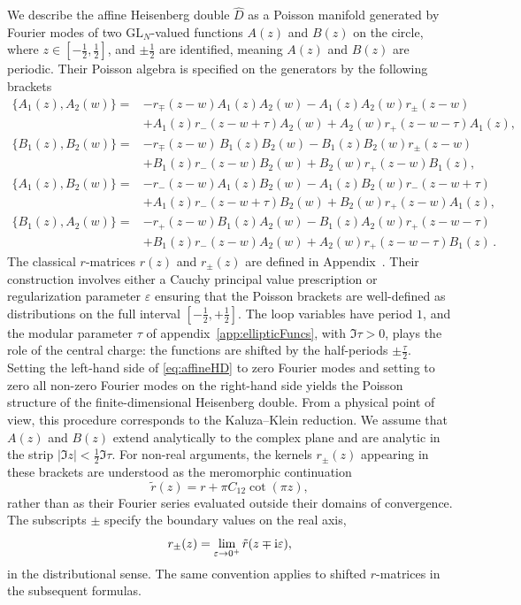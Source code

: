 We describe the affine Heisenberg double $\widehat{D}$ as a Poisson manifold generated by Fourier modes
of two $\mathrm{GL}_N$-valued functions $A(z)$ and $B(z)$ on the circle, where $z\in [-\tfrac12, \tfrac12]$, and $\pm\tfrac{1}{2}$ are identified, meaning $A(z)$ and $B(z)$ are periodic. Their Poisson algebra is specified on the generators by the following brackets
\begin{equation}
\label{eq:affineHD}
\begin{aligned}
\{ A_1(z), A_2(w) \}
= &-r_{\mp}(z-w) A_1(z)A_2(w)
- A_1(z)A_2(w) r_{\pm}(z-w)\\
&+ A_1(z)r_-(z-w+\tau)A_2(w)
+ A_2(w)r_+(z-w-\tau)A_1(z),  \\
\{ B_1(z), B_2(w) \}
=& -r_{\mp}(z-w)\,B_1(z)B_2(w)
- B_1(z)B_2(w) r_{\pm}(z-w) \\
&+ B_1(z)r_-(z-w)B_2(w)
+ B_2(w)r_+(z-w)B_1(z),  \\
\{ A_1(z), B_2(w) \}
=& -r_-(z-w)A_1(z)B_2(w)
- A_1(z)B_2(w)r_-(z-w+\tau) \\
&+ A_1(z)r_-(z-w+\tau)B_2(w)
+ B_2(w)r_+(z-w)A_1(z),   \\
\{ B_1(z), A_2(w) \}
= &-r_+(z-w)B_1(z)A_2(w)
-B_1(z)A_2(w)r_+(z-w-\tau) \\
&+ B_1(z)r_-(z-w)A_2(w)+ A_2(w)r_+(z-w-\tau)B_1(z)
 \, .
\end{aligned}
\end{equation}
The classical $r$-matrices $r(z)$ and $r_{\pm}(z)$ are  defined in Appendix~\todo{[TODO: missing appendix \texttt{app:matrix\_bblocks} of the paper; include the overall factor $\varkappa=2\pi\I$]}.  Their construction involves either a Cauchy principal value prescription or regularization parameter $\varepsilon$ ensuring that the Poisson brackets are well-defined as distributions on the full interval $[-\tfrac12, +\tfrac12]$. The loop variables have period $1$, and the modular parameter $\tau$ of appendix~\ref{app:ellipticFuncs}, with $\Im \tau>0$, plays the role of the central charge: the functions are shifted by the half-periods $\pm\tfrac{\tau}{2}$.  Setting the left-hand side of \eqref{eq:affineHD} to zero Fourier modes and setting to zero all non-zero Fourier modes on the right-hand side yields the Poisson structure of the finite-dimensional Heisenberg double. From a physical point of view, this procedure corresponds to the Kaluza--Klein reduction. We assume that $A(z)$ and $B(z)$ extend analytically to the complex plane and are analytic in the strip $|\Im z|< \tfrac{1}{2}\Im \tau$. For non-real arguments, the kernels $r_\pm(z)$ appearing in these brackets are understood as the meromorphic continuation
\begin{equation}
\tilde r(z)=r+\pi C_{12}\cot(\pi z),
\end{equation}
rather than as their Fourier series evaluated outside their domains of convergence. The subscripts $\pm$ specify the boundary values on the real axis,
\begin{equation}
    r_\pm(z)=\lim_{\varepsilon\to0^+}
\tilde r(z\mp \mathrm{i} \varepsilon),
\end{equation}
in the distributional sense. The same convention applies to shifted $r$-matrices in the subsequent formulas.

